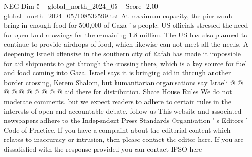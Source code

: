 \begin{textsample}{NEG Dim 5 – global\_north\_2024\_05 – Score -2.00 – global\_north\_2024\_05/108532599.txt}
At maximum capacity, the pier would bring in enough food for 500,000 of Gaza ' s people.
US officials stressed the need for open land crossings for the remaining 1.8 million.
The US has also planned to continue to provide airdrops of food, which likewise can not meet all the needs.
A deepening Israeli offensive in the southern city of Rafah has made it impossible for aid shipments to get through the crossing there, which is a key source for fuel and food coming into Gaza.
Israel says it is bringing aid in through another border crossing, Kerem Shalom, but humanitarian organisations say Israeli @ @ @ @ @ @ @ @ @ @ aid there for distribution.
Share House Rules We do not moderate comments, but we expect readers to adhere to certain rules in the interests of open and accountable debate. follow us This website and associated newspapers adhere to the Independent Press Standards Organisation ' s Editors ' Code of Practice.
If you have a complaint about the editorial content which relates to inaccuracy or intrusion, then please contact the editor here.
If you are dissatisfied with the response provided you can contact IPSO here

\end{textsample}
